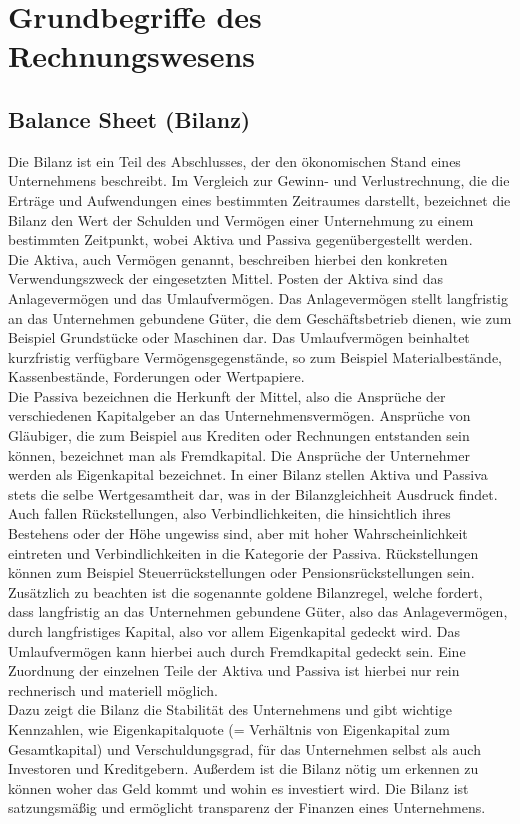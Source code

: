 \section{Grundbegriffe des Rechnungswesens}

\subsection{Balance Sheet (Bilanz)}
Die Bilanz ist ein Teil des Abschlusses, der den ökonomischen Stand eines Unternehmens beschreibt. Im Vergleich zur Gewinn- und Verlustrechnung, die die Erträge und Aufwendungen eines bestimmten Zeitraumes darstellt, bezeichnet die Bilanz den Wert der Schulden und Vermögen einer Unternehmung zu einem bestimmten Zeitpunkt, wobei Aktiva und Passiva gegenübergestellt werden.
\\
Die Aktiva, auch Vermögen genannt, beschreiben hierbei den konkreten Verwendungszweck der eingesetzten Mittel. Posten der Aktiva sind das Anlagevermögen und das Umlaufvermögen. Das Anlagevermögen stellt langfristig an das Unternehmen gebundene Güter, die dem Geschäftsbetrieb dienen, wie zum Beispiel Grundstücke oder Maschinen dar. Das Umlaufvermögen beinhaltet kurzfristig verfügbare Vermögensgegenstände, so zum Beispiel Materialbestände, Kassenbestände, Forderungen oder Wertpapiere.
\\
Die Passiva bezeichnen die Herkunft der Mittel, also die Ansprüche der verschiedenen Kapitalgeber an das Unternehmensvermögen. Ansprüche von Gläubiger, die zum Beispiel aus Krediten oder Rechnungen entstanden sein können, bezeichnet man als Fremdkapital. Die Ansprüche der Unternehmer werden als Eigenkapital bezeichnet. 
In einer Bilanz stellen Aktiva und Passiva stets die selbe Wertgesamtheit dar, was in der Bilanzgleichheit Ausdruck findet. Auch fallen Rückstellungen, also Verbindlichkeiten, die hinsichtlich ihres Bestehens oder der Höhe ungewiss sind, aber mit hoher Wahrscheinlichkeit eintreten und Verbindlichkeiten in die Kategorie der Passiva. Rückstellungen können zum Beispiel Steuerrückstellungen oder Pensionsrückstellungen sein. Zusätzlich zu beachten ist die sogenannte goldene Bilanzregel, welche fordert, dass langfristig an das Unternehmen gebundene Güter, also das Anlagevermögen, durch langfristiges Kapital, also vor allem Eigenkapital gedeckt wird. Das Umlaufvermögen kann hierbei auch durch Fremdkapital gedeckt sein. Eine Zuordnung der einzelnen Teile der Aktiva und Passiva ist hierbei nur rein rechnerisch und materiell möglich.
\\
Dazu zeigt die Bilanz die Stabilität des Unternehmens und gibt wichtige Kennzahlen, wie Eigenkapitalquote (= Verhältnis von Eigenkapital zum Gesamtkapital) und Verschuldungsgrad, für das Unternehmen selbst als auch Investoren und Kreditgebern. Außerdem ist die Bilanz nötig um erkennen zu können woher das Geld kommt und wohin es investiert wird. Die Bilanz ist satzungsmäßig und ermöglicht transparenz der Finanzen eines Unternehmens.

